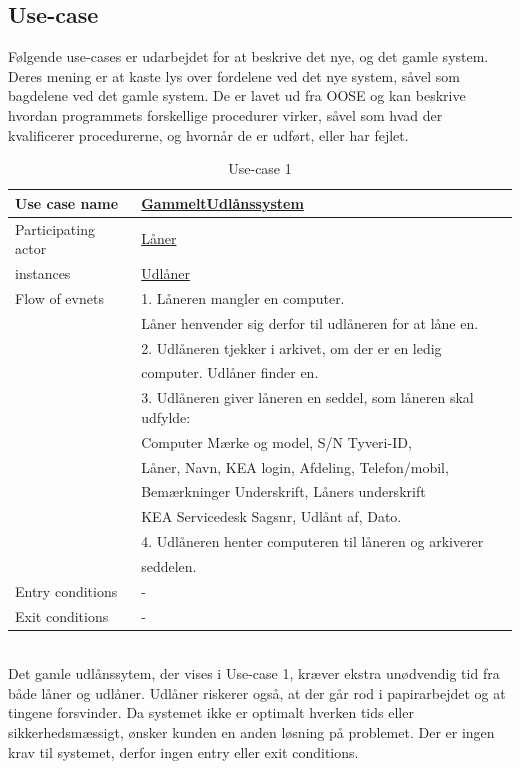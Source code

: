 \documentclass[a4paper]{article}
\begin{document}
\subsection{Use-case}
Følgende use-cases er udarbejdet for at beskrive det nye, og det gamle system. Deres mening er at kaste lys over fordelene ved det nye system, såvel som bagdelene ved det gamle system. De er lavet ud fra OOSE \cite[p~44]{OOSE} og kan beskrive hvordan programmets forskellige procedurer virker, såvel som hvad der kvalificerer procedurerne, og hvornår de er udført, eller har fejlet.
\begin{table}[h]
\caption{Use-case 1}
\begin{tabular}{ll}
Use case name                 & \underline{GammeltUdlånssystem} \\ \hline
Participating actor           & \underline{Låner} \\
instances                     & \underline{Udlåner} \\ \hline
Flow of evnets                & 1. Låneren mangler en computer.\\& Låner henvender sig derfor til udlåneren for at låne en.
\\& 2. Udlåneren tjekker i arkivet, om der er en ledig \\& computer. Udlåner finder en.
\\& 3. Udlåneren giver låneren en seddel, som låneren skal udfylde: \\& Computer Mærke og model, S/N Tyveri-ID, \\& Låner, Navn, KEA login, Afdeling, Telefon/mobil, \\& Bemærkninger Underskrift, Låners underskrift \\& KEA Servicedesk Sagsnr, Udlånt af, Dato.
\\& 4. Udlåneren henter computeren til låneren og arkiverer
\\& seddelen.\\ \hline
Entry conditions & - \\ \hline
Exit conditions  & -
\end{tabular}
\end{table} \\
Det gamle udlånssytem, der vises i Use-case 1, kræver ekstra unødvendig tid fra både låner og udlåner. Udlåner riskerer også, at der går rod i papirarbejdet og at tingene forsvinder. Da systemet ikke er optimalt hverken tids eller sikkerhedsmæssigt, ønsker kunden en anden løsning på problemet. Der er ingen krav til systemet, derfor ingen entry eller exit conditions.
\end{document}

